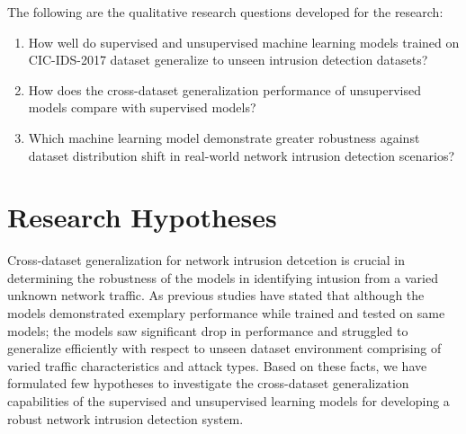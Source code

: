 The following are the qualitative research questions developed for the research:

\begin{enumerate}
    \item How well do supervised and unsupervised machine learning models trained on CIC-IDS-2017 dataset generalize to unseen intrusion detection datasets?
    \item How does the cross-dataset generalization performance of unsupervised models compare with supervised models?
    \item Which machine learning model demonstrate greater robustness against dataset distribution shift in real-world network intrusion detection scenarios?
\end{enumerate}


 \section{Research Hypotheses}
 Cross-dataset generalization for network intrusion detcetion is crucial in determining the robustness of the models in identifying intusion from a varied 
 unknown network traffic. As previous studies have stated that although the models demonstrated exemplary performance while trained and tested on same models;
 the models saw significant drop in performance and struggled to generalize efficiently with respect to unseen dataset environment comprising of varied traffic
 characteristics and attack types. Based on these facts, we have formulated few hypotheses to investigate the cross-dataset generalization capabilities of the 
 supervised and unsupervised learning models for developing a robust network intrusion detection system.

